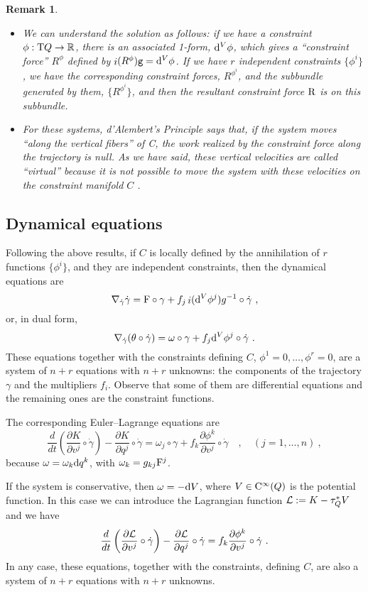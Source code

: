 \documentclass[12pt]{report}
\newtheorem{remark}[teor]{Remark}
\def\bit{\begin{itemize}}
\def\eit{\end{itemize}}
\def\derpar#1#2{\frac{\partial{#1}}{\partial{#2}}}
\def\Lag{{\cal L}}
\def\d{{\rm d}}
\def\Real{\mathbb{R}}
\def\Tan{{\rm T}}
\def\inn{\mathop{i}\nolimits}
\def\Cinfty{{\rm C}^\infty}
\begin{document}
\begin{remark}{\rm  
\bit
\item 
We can understand the solution as follows: if we have a constraint $\phi:\Tan Q\to\Real$, there is an associated 1-form, $\d^V\phi$, which gives a ``constraint force'' $R^{\phi}$ defined by $\inn(R^{\phi}){\tt g}=\d^V\phi$.
If we have $r$ independent constraints $\{\phi^i\}$, we have the corresponding constraint forces, $R^{\phi^i}$, and the subbundle generated by them, $\{R^{\phi^i}\}$, and then the resultant constraint force ${\rm R}$ is on this subbundle.
\item 
For these systems, d'Alembert's Principle says that, if the system moves ``along the vertical fibers'' of C,  the work realized by the constraint force along the trajectory is null. As we have said, these vertical velocities are called ``virtual'' because it is not possible to move the system with these velocities on the constraint manifold $C$ .
\eit
}\end{remark}


\subsection{Dynamical equations}


Following the above results,
if $C$ is locally defined by the annihilation of
$r$  functions $\{\phi^i\}$, and they are independent constraints,
then the dynamical equations are
$$
\nabla_{\dot\gamma}\dot\gamma ={\rm F}\circ\gamma+f_j\inn(\d^V\phi^j)g^{-1}\circ\dot\gamma \ ,
$$
or, in dual form,
$$
\nabla_{\dot\gamma}(\theta\circ\dot\gamma)=
\omega\circ\gamma+f_j\d^V\phi^j\circ\dot\gamma \ .
$$
These equations together with the constraints defining $C$, $\phi^1=0,\ldots,\phi^r=0$,
are a system of $n+r$ equations with $n+r$ unknowns:
the components of the trajectory $\gamma$ and the multipliers $f_i$. Observe that some of them are differential equations and the remaining ones are the constraint functions.

The corresponding Euler--Lagrange equations are
$$
\frac{d}{d t}\left(\derpar{K}{v^j}\circ\dot\gamma\right)-
\derpar{K}{q^j}\circ\dot\gamma=
\omega_j\circ\gamma +f_k\derpar{\phi^k}{v^j}\circ\dot\gamma
\quad , \quad (j=1,\ldots ,n) \ ,
$$
because $\omega=\omega_k\d q^k$, with $\omega_k=g_{kj}{\rm F}^j$.

If the system is conservative, then $\omega=-\d V$,
where $V\in\Cinfty (Q)$ is the potential function. In this case we can introduce the Lagrangian function $\Lag:=K-\tau_Q^*V$ and we have
$$
\frac{d}{d t}\left(\derpar{\Lag }{v^j}\circ\dot\gamma\right)-
\derpar{\Lag}{q^j}\circ\dot\gamma=
f_k\derpar{\phi^k}{v^j}\circ\dot\gamma \ .
$$
In any case, these equations, together with the constraints, defining $C$, are also a system of $n+r$ equations with $n+r$ unknowns.
\end{document}
